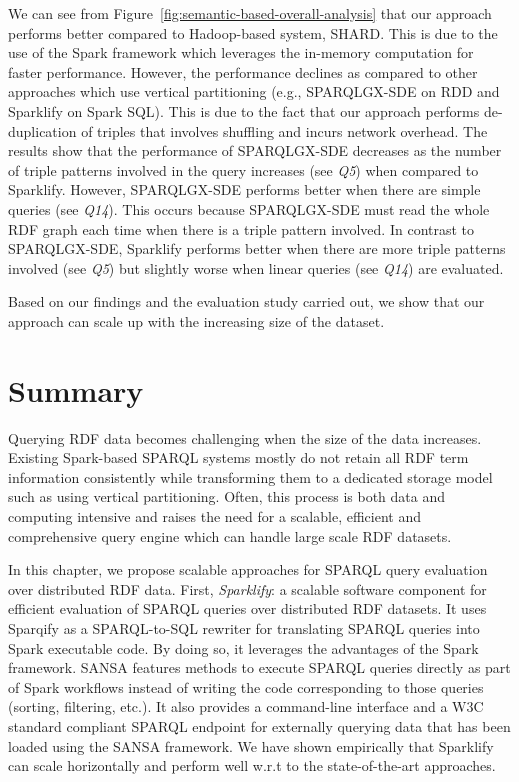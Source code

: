 We can see from Figure~\ref{fig:semantic-based-overall-analysis} that our approach performs better compared to Hadoop-based system, SHARD. 
This is due to the use of the Spark framework which leverages the in-memory computation for faster performance.
However, the performance declines as compared to other approaches which use vertical partitioning (e.g., SPARQLGX-SDE on \gls{RDD} and Sparklify on Spark SQL).
This is due to the fact that our approach performs de-duplication of triples that involves shuffling and incurs network overhead.
The results show that the performance of SPARQLGX-SDE decreases as the number of triple patterns involved in the query increases (see \textit{Q5}) when compared to Sparklify. 
However, SPARQLGX-SDE performs better when there are simple queries (see \textit{Q14}). 
This occurs because SPARQLGX-SDE must read the whole RDF graph each time when there is a triple pattern involved.
In contrast to SPARQLGX-SDE, Sparklify performs better when there are more triple patterns involved (see \textit{Q5}) but slightly worse when linear queries (see \textit{Q14}) are evaluated. 

Based on our findings and the evaluation study carried out, we show that our approach can scale up with the increasing size of the dataset.

\section{Summary}
\label{sec:scalable-rdf-querying-summary}
Querying \gls{RDF} data becomes challenging when the size of the data increases.
Existing Spark-based \gls{SPARQL} systems mostly
do not retain all \gls{RDF} term information consistently while transforming them to a dedicated storage model such as using vertical partitioning.
Often, this process is both data and computing intensive and raises the need for a scalable, efficient and comprehensive query engine which can handle large scale \gls{RDF} datasets.

In this chapter, we propose scalable approaches for \gls{SPARQL} query evaluation over distributed \gls{RDF} data. 
First, \emph{Sparklify}: a scalable software component for efficient evaluation of \gls{SPARQL} queries over distributed \gls{RDF} datasets. 
It uses Sparqify as a SPARQL-to-SQL rewriter for translating \gls{SPARQL} queries into Spark executable code.
By doing so, it leverages the advantages of the Spark framework.
SANSA features methods to execute \gls{SPARQL} queries directly as part of Spark workflows instead of writing the code corresponding to those queries (sorting, filtering, etc.).
It also provides a command-line interface and a \gls{W3C} standard compliant \gls{SPARQL} endpoint for externally querying data that has been loaded using the SANSA framework.
We have shown empirically that Sparklify can scale horizontally and perform well w.r.t to the state-of-the-art approaches.

